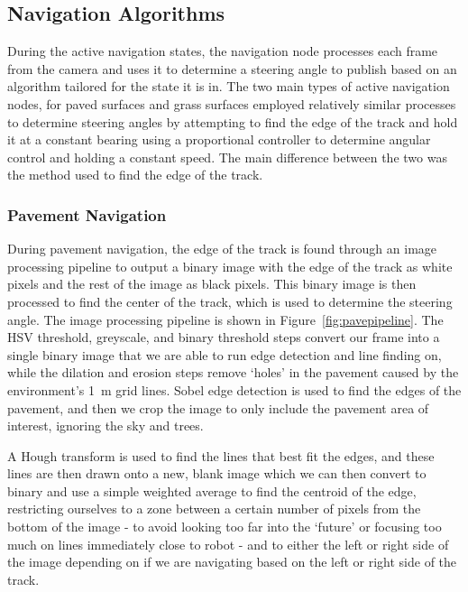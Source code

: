 \documentclass[titlepage, twocolumn]{article}
\begin{document}
            
    \subsection{Navigation Algorithms}

        During the active navigation states, the navigation node processes each frame from the camera and uses it to determine a steering angle to publish based on an algorithm tailored for the state it is in. The two main types of active navigation nodes, for paved surfaces and grass surfaces employed relatively similar processes to determine steering angles by attempting to find the edge of the track and hold it at a constant bearing using a proportional controller to determine angular control and holding a constant speed. The main difference between the two was the method used to find the edge of the track.

        \subsubsection{Pavement Navigation}
            
            During pavement navigation, the edge of the track is found through an image processing pipeline to output a binary image with the edge of the track as white pixels and the rest of the image as black pixels. This binary image is then processed to find the center of the track, which is used to determine the steering angle. The image processing pipeline is shown in Figure~\ref{fig:pavepipeline}. The HSV threshold, greyscale, and binary threshold steps convert our frame into a single binary image that we are able to run edge detection and line finding on, while the dilation and erosion steps remove `holes' in the pavement caused by the environment's 1~m grid lines. Sobel edge detection is used to find the edges of the pavement, and then we crop the image to only include the pavement area of interest, ignoring the sky and trees. 
            
            A Hough transform is used to find the lines that best fit the edges, and these lines are then drawn onto a new, blank image which we can then convert to binary and use a simple weighted average to find the centroid of the edge, restricting ourselves to a zone between a certain number of pixels from the bottom of the image - to avoid looking too far into the `future' or focusing too much on lines immediately close to robot - and to either the left or right side of the image depending on if we are navigating based on the left or right side of the track. 
\end{document}
